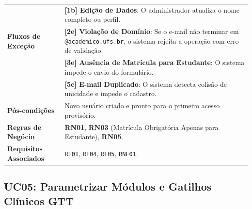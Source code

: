 \begin{table}[!ht]
\begin{tabularx}{\textwidth}{p{3.5cm} X}
& \textbf{[1b] Edição de Dados}: O administrador atualiza o nome completo ou perfil. \\
\textbf{Fluxos de Exceção} & 
\textbf{[2e] Violação de Domínio}: Se o e-mail não terminar em \texttt{@academico.ufs.br}, o sistema rejeita a operação com erro de validação.\\
& \textbf{[3e] Ausência de Matrícula para Estudante}: O sistema impede o envio do formulário.\\
& \textbf{[5e] E-mail Duplicado}: O sistema detecta colisão de unicidade e impede o cadastro. \\
\textbf{Pós-condições} & Novo usuário criado e pronto para o primeiro acesso provisório. \\
\textbf{Regras de Negócio} & \textbf{RN01}, \textbf{RN03} (Matrícula Obrigatória Apenas para Estudante), \textbf{RN05}. \\
\textbf{Requisitos Associados} & \texttt{RF01}, \texttt{RF04}, \texttt{RF05}, \texttt{RNF01}. \\
\bottomrule
\end{tabularx}
\end{table}

\subsection{UC05: Parametrizar Módulos e Gatilhos Clínicos GTT}
\label{uc05_especificacao}

